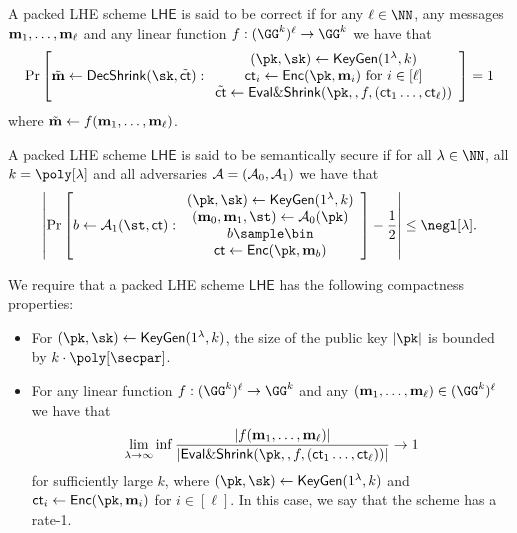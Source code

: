 \begin{definition}[Correctness]
A packed LHE scheme $\mathsf{LHE}$ is said to be correct if for any $\ell\in\NN$, any messages $\mathbf{m}_1, \dots, \mathbf{m}_\ell$ and any linear function $f:(\GG^{ k})^\ell\to \GG^k$ we have that $$\Pr\left[\tilde \mn \leftarrow \mathsf{DecShrink}(\sk,\tilde \ct):\begin{array}{c}
    (\pk,\sk)\leftarrow \mathsf{KeyGen}(1^\lambda,k) \\
    \ct_i\leftarrow \mathsf{Enc}(\pk,\mn_i) \text{ for }i \in[\ell]\\ 
  \tilde \ct\leftarrow  \evalshrink (\pk,,f,(\ct_1\dots, \ct_\ell))
\end{array}\right]=1$$ where $\tilde {\mathbf{m}}\leftarrow f(\mathbf{m}_1,\dots, \mathbf{m}_\ell)$.
 \end{definition}
 
 \begin{definition} 
 A packed LHE scheme $\mathsf{LHE}$ is said to be semantically secure if for all $\lambda\in\NN$, all $k=\poly[\lambda]$ and all adversaries $\mathcal{A}=(\mathcal{A}_0,\mathcal{A}_1)$ we have that $$\left|\Pr\left[b\leftarrow\Ac_1(\st,\ct):\begin{array}{c}
    (\pk,\sk)\leftarrow \mathsf{KeyGen}(1^\lambda,k) \\
    (\mn_0,\mn_1,\st)\leftarrow\Ac_0(\pk)\\ 
    b\sample \bin \\ 
  \ct\leftarrow \mathsf{Enc}(\pk,\mn_b)
\end{array}\right]-\frac{1}{2}\right|\leq \negl[\lambda].$$
 \end{definition}
 
  \begin{definition}[Compactness] 
  We require that a packed LHE scheme $\mathsf{LHE}$ has the following compactness properties:
  \begin{itemize}
      \item For $(\pk,\sk)\leftarrow \mathsf{KeyGen}(1^\lambda,k)$, the size of the public key $|\pk|$ is bounded  by $k\cdot \poly[\secpar]$.
     \item For any linear function $f:(\GG^{ k})^\ell\to \GG^k$ and any $(\mn_1,\dots,\mn_\ell)\in(\GG^{ k})^\ell$  we have that $$ \lim_{\lambda\rightarrow \infty} \inf \frac{|f(\mn_1,\dots ,\mn_\ell)|}{| \evalshrink (\pk,,f,(\ct_1\dots, \ct_\ell))|} \rightarrow 1$$ for sufficiently large $k$, where $(\pk,\sk)\leftarrow \mathsf{KeyGen}(1^\lambda,k)$ and $ \ct_i\leftarrow \mathsf{Enc}(\pk,\mn_i)$ for $i \in[\ell]$. In this case, we say that the scheme has a rate-1.
  \end{itemize}
 \end{definition}


